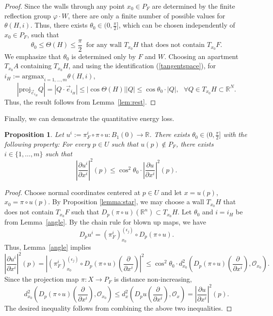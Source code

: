 \documentclass[12pt]{amsart}
\newtheorem{proposition}[theorem]{Proposition}
\theoremstyle{definition}
\numberwithin{equation}{section}
\newcommand{\R}{\mathbb R}
\newcommand{\ee}{{(\epsilon_j)}}
\newcommand{\PF}{P_F}
\begin{document}
\begin{proof} 
 Since  the walls through any point $x_0 \in \PF$ are determined by the finite reflection group $\varphi \cdot W$, there are only a finite number of possible values for $\theta(H,i)$.  Thus, there exists  $\theta_0 \in (0,\frac\pi2]$, which can be chosen independently of  $x_0 \in \PF$, such that
\[
\theta_0 \leq \Theta(H) \leq \frac{\pi}{2} \ \mbox{ for any wall $T_{x_0}H$ that does not contain $T_{x_0}F$.}
\]
We emphasize that $\theta_0$ is determined only by $F$ and $W$.
Choosing an apartment $T_{x_0}A$ containing $T_{x_0}H$, and using the identification (\ref{tangentspace}), for $i_H:=\mathrm{argmax}_{i=1, \dots, m} \theta(H,i)$, 
$$
 |\text{proj}_{\vec e_{i_H}}Q|=|Q \cdot \vec e_{i_H}| \leq  |\cos \Theta(H)| |Q|  \leq \cos \theta_0 \cdot |Q|, \ \ \ \forall Q \in T_{x_0}H \subset \R^N.
 $$
Thus, the result  follows from Lemma~\ref{lem:rest}.
\end{proof}




Finally, we can demonstrate the quantitative energy loss.





\begin{proposition} \label{anglek}
Let $u^i:= \pi_F^i \circ \pi \circ u:  B_1(0) \rightarrow \R$.  
There exists $\theta_0 \in (0,\frac{\pi}{2}]$ with the following property:  For every $p \in U$  such that $u(p) \notin \PF$,  there exists  $i \in \{1,\dots, m\}$ such that
\[
 \left|\frac{\partial u^i}{\partial x^i} \right|^2(p) \leq \cos^2 \theta_0 \cdot \left|\frac{\partial u}{\partial x^i} \right|^2(p).
 \]
\end{proposition}
\begin{proof}
Choose normal coordinates centered at $p \in U$ and let $x=u(p)$, $x_0=\pi \circ u(p)$.
  By Proposition \ref{lemma:star}, we may choose a wall $T_{x_0}H$ that does not contain $T_{x_0}F$ such that  $D_p(\pi \circ u)(\R^n) \subset T_{x_0}H$. 
  Let $\theta_0$ and $i=i_H$ be from Lemma~\ref{angle}.  
By the chain rule for blown up maps, we have
\[
D_pu^i = (\pi_{F}^i)_{x_0}^\ee \circ D_p(\pi \circ u).
\]
Thus, Lemma~\ref{angle} implies
  \[
 \left|\frac{\partial u^i}{\partial x^i} \right|^2(p) = \left|(\pi_{F}^i)_{x_0}^\ee \circ D_p(\pi \circ u)\left(\frac{\partial}{\partial x^i}\right) \right|^2  \leq \cos^2 \theta_0 \cdot d_{x_0}^2\left(D_p(\pi \circ u)\left(\frac{\partial}{\partial x^i}\right), \mathcal O_{x_0}\right).
\]
Since  the projection map $\pi:X \rightarrow \PF$ is distance non-increasing, 
\[
d_{x_0}^2\left(D_p(\pi \circ u)\left(\frac{\partial}{\partial x^i}\right), \mathcal O_{x_0}\right)
\leq d_x^2\left(D_pu \left(\frac{\partial}{\partial x^i}\right), \mathcal O_x\right)= \left|\frac{\partial u}{\partial x^i} \right|^2(p).
\]
The desired inequality follows from combining the above two inequalities.
\end{proof}
\end{document}
